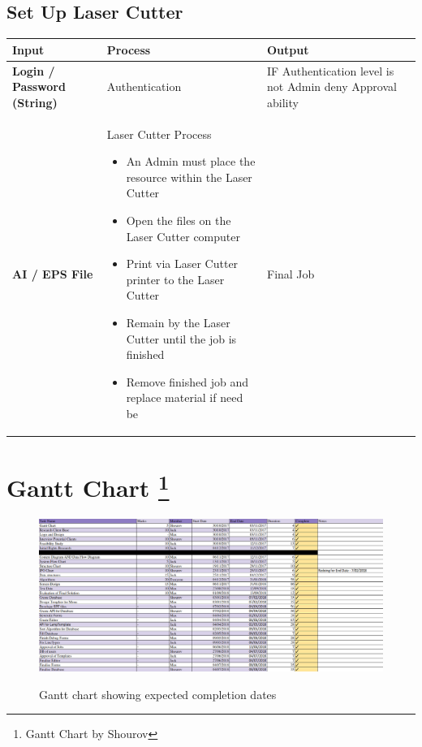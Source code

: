 \documentclass[oneside,openany,11pt,a4paper]{report}
\begin{document}
\subsection{Set Up Laser Cutter}
\begin{longtable}{|p{3cm}|p{5cm}|p{4cm}|}	
	\hline
	\rowcolor{gray!40}
	\textbf{Input} & \textbf{Process}  & \textbf{Output} \\ \hline
	
	\rowcolor{white}
	\textbf{Login / Password (String)} &  
	Authentication
	&  IF Authentication level is not Admin deny Approval ability \\ \hline
	
	\rowcolor{gray!25}
	\textbf{AI / EPS File} &  
	Laser Cutter Process
	\begin{itemize}
		\itemsep0em
		\item An Admin must place the resource within the Laser Cutter
		\item Open the files on the Laser Cutter computer
		\item Print via Laser Cutter printer to the Laser Cutter
		\item Remain by the Laser Cutter until the job is finished
		\item Remove finished job and replace material if need be
	\end{itemize}
	& Final Job

	\\ \hline
\end{longtable} 
\pagebreak
\section[Gantt Chart]{Gantt Chart \protect\footnote{Gantt Chart by Shourov}}
\begin{figure}[H]
	\includegraphics[width=\textwidth]{ganttchart1.png}
	\\
	\vspace{1cm}
	
	\caption{Gantt chart showing expected completion dates}
\end{figure}
\end{document}
